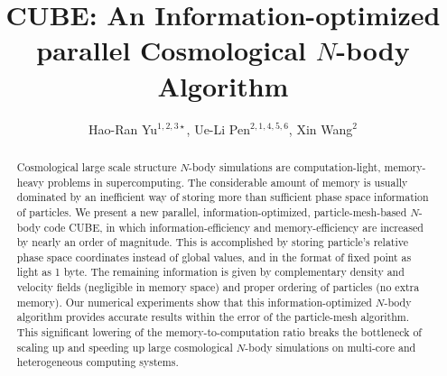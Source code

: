\documentclass[10pt,twocolumn,preprint]{emulateapj}
\begin{document}
\title{CUBE: An Information-optimized parallel Cosmological $N$-body Algorithm}
\author{
Hao-Ran Yu$^{1,2,3\star}$,
Ue-Li Pen$^{2,1,4,5,6}$,
Xin Wang$^{2}$
}



\begin{abstract}
Cosmological large scale structure $N$-body simulations are computation-light, memory-heavy problems in supercomputing. The considerable amount of memory is usually dominated by an inefficient way of storing more than sufficient phase space information of particles. We present a new parallel, information-optimized, particle-mesh-based $N$-body code CUBE, in which information-efficiency and memory-efficiency are increased by nearly an order of magnitude. This is accomplished by storing particle's relative phase space coordinates instead of global values, and in the format of fixed point as light as 1 byte. The remaining information is given by complementary density and velocity fields (negligible in memory space) and proper ordering of particles (no extra memory). Our numerical experiments show that this information-optimized $N$-body algorithm provides accurate results within the error of the particle-mesh algorithm. This significant lowering of the memory-to-computation ratio breaks the bottleneck of scaling up and speeding up large cosmological $N$-body simulations on multi-core and heterogeneous computing systems.

\end{abstract}

\keywords{}

\maketitle
\end{document}
